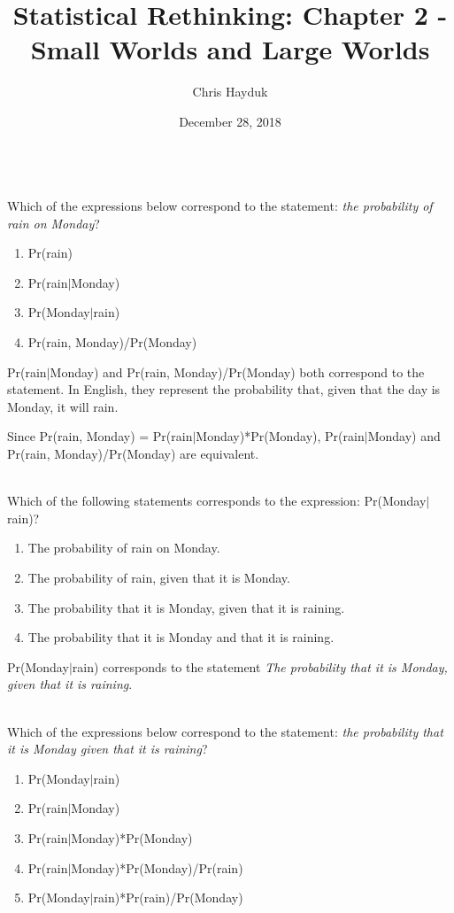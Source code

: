 \documentclass[12pt]{article}\usepackage[]{graphicx}\usepackage[]{color}
\newenvironment{problem}[2][Problem]{\begin{trivlist}
\item[\hskip \labelsep {\bfseries #1}\hskip \labelsep {\bfseries #2.}]}{\end{trivlist}}
\begin{document}
\title{Statistical Rethinking: Chapter 2 - Small Worlds and Large Worlds}

\author{Chris Hayduk}
\date{December 28, 2018}

\maketitle




\begin{problem}{2E1}
\text{ }\\
Which of the expressions below correspond to the statement: \textit{the probability of rain on Monday}?
\begin{enumerate}
	\item Pr(rain)
	\item Pr(rain$\vert$Monday)
	\item Pr(Monday$\vert$rain)
	\item Pr(rain, Monday)/Pr(Monday)
\end{enumerate}
\end{problem}

Pr(rain$\vert$Monday) and Pr(rain, Monday)/Pr(Monday) both correspond to the statement. In English, they represent the probability that, given that the day is Monday, it will rain.

Since Pr(rain, Monday) = Pr(rain$\vert$Monday)*Pr(Monday), Pr(rain$\vert$Monday) and Pr(rain, Monday)/Pr(Monday) are equivalent.

\begin{problem}{2E2}
\text{}\\
Which of the following statements corresponds to the expression: Pr(Monday$\vert$rain)?
\begin{enumerate}
	\item The probability of rain on Monday.
	\item The probability of rain, given that it is Monday.
	\item The probability that it is Monday, given that it is raining.
	\item The probability that it is Monday and that it is raining.
\end{enumerate}
\end{problem}

Pr(Monday$\vert$rain) corresponds to the statement \textit{The probability that it is Monday, given that it is raining}.

\begin{problem}{2E3}
\text{}\\
Which of the expressions below correspond to the statement: \textit{the probability that it is Monday given that it is raining}?
\begin{enumerate}
	\item Pr(Monday$\vert$rain)
	\item Pr(rain$\vert$Monday)
	\item Pr(rain$\vert$Monday)*Pr(Monday)
	\item Pr(rain$\vert$Monday)*Pr(Monday)/Pr(rain)
	\item Pr(Monday$\vert$rain)*Pr(rain)/Pr(Monday)
\end{enumerate}
\end{problem}
\end{document}
